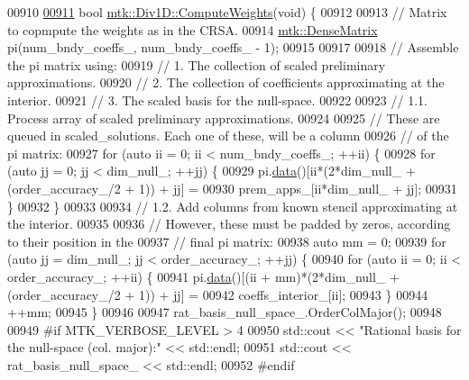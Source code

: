 \begin{DoxyCode}
{{00910 
\hypertarget{mtk__div__1d_8cc_source_l00911}{}\hyperlink{classmtk_1_1Div1D_aaadd6a6e6836bb94841c4c35dffab828}{00911} \textcolor{keywordtype}{bool} \hyperlink{classmtk_1_1Div1D_aaadd6a6e6836bb94841c4c35dffab828}{mtk::Div1D::ComputeWeights}(\textcolor{keywordtype}{void}) \{
00912 
00913   \textcolor{comment}{// Matrix to copmpute the weights as in the CRSA.}
00914   \hyperlink{classmtk_1_1DenseMatrix}{mtk::DenseMatrix} pi(num\_bndy\_coeffs\_, num\_bndy\_coeffs\_ - 1);
00915 
00917 
00918   \textcolor{comment}{// Assemble the pi matrix using:}
00919   \textcolor{comment}{// 1. The collection of scaled preliminary approximations.}
00920   \textcolor{comment}{// 2. The collection of coefficients approximating at the interior.}
00921   \textcolor{comment}{// 3. The scaled basis for the null-space.}
00922 
00923   \textcolor{comment}{// 1.1. Process array of scaled preliminary approximations.}
00924 
00925   \textcolor{comment}{// These are queued in scaled\_solutions. Each one of these, will be a column}
00926   \textcolor{comment}{// of the pi matrix:}
00927   \textcolor{keywordflow}{for} (\textcolor{keyword}{auto} ii = 0; ii < num\_bndy\_coeffs\_; ++ii) \{
00928     \textcolor{keywordflow}{for} (\textcolor{keyword}{auto} jj = 0; jj < dim\_null\_; ++jj) \{
00929       pi.\hyperlink{classmtk_1_1DenseMatrix_a0c33b8a9e01d157c61ddbdf807c25d84}{data}()[ii*(2*dim\_null\_ + (order\_accuracy\_/2 + 1)) + jj] =
00930         prem\_apps\_[ii*dim\_null\_ + jj];
00931     \}
00932   \}
00933 
00934   \textcolor{comment}{// 1.2. Add columns from known stencil approximating at the interior.}
00935 
00936   \textcolor{comment}{// However, these must be padded by zeros, according to their position in the}
00937   \textcolor{comment}{// final pi matrix:}
00938   \textcolor{keyword}{auto} mm = 0;
00939   \textcolor{keywordflow}{for} (\textcolor{keyword}{auto} jj = dim\_null\_; jj < order\_accuracy\_; ++jj) \{
00940     \textcolor{keywordflow}{for} (\textcolor{keyword}{auto} ii = 0; ii < order\_accuracy\_; ++ii) \{
00941       pi.\hyperlink{classmtk_1_1DenseMatrix_a0c33b8a9e01d157c61ddbdf807c25d84}{data}()[(ii + mm)*(2*dim\_null\_ + (order\_accuracy\_/2 + 1)) + jj] =
00942         coeffs\_interior\_[ii];
00943     \}
00944     ++mm;
00945   \}
00946 
00947   rat\_basis\_null\_space\_.OrderColMajor();
00948 
00949 \textcolor{preprocessor}{  #if MTK\_VERBOSE\_LEVEL > 4}
00950   std::cout << \textcolor{stringliteral}{"Rational basis for the null-space (col. major):"} << std::endl;
00951   std::cout << rat\_basis\_null\_space\_ << std::endl;
00952 \textcolor{preprocessor}{  #endif}
}}
\end{DoxyCode}
